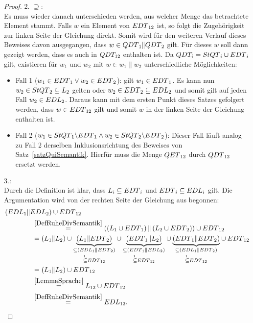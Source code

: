 \begin{proof}
  2. \glqq{}$\supseteq$\grqq{}:\\
  Es muss wieder danach unterschieden werden, aus welcher Menge das betrachtete
  Element stammt. Falls $w$ ein Element von $EDT{}_{12}$ ist, so folgt die
  Zugehörigkeit zur linken Seite der Gleichung direkt. Somit wird für den
  weiteren Verlauf dieses Beweises davon ausgegangen, dass $w\in
  QDT{}_1\|QDT{}_2$ gilt. Für dieses $w$ soll dann gezeigt werden, dass es
  auch in $QDT_{12}$ enthalten ist. Da $QDT_i=StQT{}_i\cup EDT{}_i$ gilt,
  existieren für $w_1$ und $w_2$ mit $w\in w_1\|w_2$ unterschiedliche
  Möglichkeiten:
  \begin{itemize}
    \item Fall 1 ($w_1\in EDT{}_1 \vee w_2\in EDT{}_2$): \OBdA{} gilt $w_1\in
      EDT{}_1$. Es kann nun $w_2\in StQT{}_2 \subseteq L_2$ gelten oder
      $w_2\in EDT{}_2\subseteq EDL{}_2$ und somit gilt auf jeden Fall $w_2\in
      EDL{}_2$. Daraus kann mit dem ersten Punkt dieses Satzes gefolgert
      werden, dass $w\in EDT{}_{12}$ gilt und somit $w$ in der linken Seite
      der Gleichung enthalten ist.
    \item Fall 2 ($w_1\in StQT{}_1\backslash EDT{}_1 \wedge w_2\in StQT{}_2
      \backslash EDT{}_2$): Dieser Fall läuft analog zu Fall 2 derselben
      Inklusionsrichtung des Beweises von Satz~\ref{satzQuiSemantik}. Hierfür
      muss die Menge $QET{}_{12}$ durch $QDT{}_{12}$ ersetzt werden.
  \end{itemize}

  3.:\\
  Durch die Definition ist klar, dass $L_i\subseteq EDT{}_i$ und
  $EDT{}_i\subseteq EDL{}_i$ gilt. Die
  Argumentation wird von der rechten Seite der Gleichung aus begonnen:
  \begin{align*}
    &(EDL{}_1\| EDL{}_2)\cup EDT{}_{12}\\
    &\qquad\qquad\overset{\ref{DefRuheDivSemantik}}{=}\left(\left(L_1\cup
  EDT{}_1\right)\|\left(L_2\cup EDT{}_2\right)\right)\cup EDT{}_{12}\\
    &\qquad\qquad=(L_1\|L_2) \cup \underset{\overset{1.}{\subseteq} EDT{}_{12}}{\underset{\subseteq
    (EDL{}_1\|EDT{}_2)}{\underbrace{(L_1\|EDT{}_2)}}} \cup
    \underset{\overset{1.}{\subseteq} EDT{}_{12}}{\underset{\subseteq
    (EDT{}_1\|EDL{}_2)}{\underbrace{(EDT{}_1\|L_2)}}} \cup
    \underset{\overset{1.}{\subseteq}
    EDT{}_{12}}{\underset{\subseteq
    (EDL{}_1\|EDT{}_2)}{\underbrace{(EDT{}_1\|EDT{}_2)}}} \cup EDT{}_{12}\\
    &\qquad\qquad=(L_1\|L_2) \cup EDT{}_{12}\\
    &\qquad\qquad\overset{\ref{LemmaSprache}}{=}L_{12}\cup EDT{}_{12}\\
    &\qquad\qquad\overset{\ref{DefRuheDivSemantik}}{=}EDL{}_{12}.
  \end{align*}
\end{proof}

